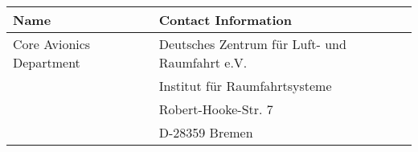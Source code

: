 
\begin{tabularx}{\textwidth}{lX}
\toprule
\textbf{Name} 		& \textbf{Contact Information}\\
\midrule
Core Avionics Department  	& Deutsches Zentrum für Luft- und Raumfahrt e.V. \\ 	
							& Institut für Raumfahrtsysteme \\											
							& Robert-Hooke-Str. 7 \\
							& D-28359 Bremen \\
\bottomrule
\end{tabularx}

